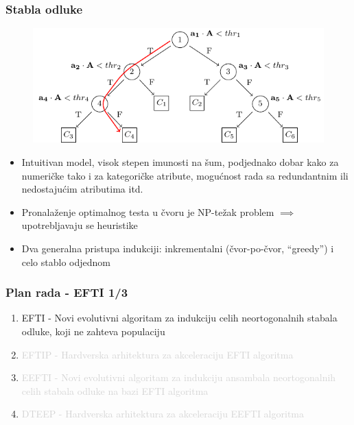 \documentclass{beamer}
\newcommand{\light}[1]{\textcolor{lightgray}{#1}}
\begin{document}
\begin{frame}[fragile]
\frametitle{Stabla odluke}
\begin{figure}
\includegraphics[width=0.7\linewidth]{oblique_dt_traversal.pdf}
\end{figure}
\begin{itemize}
\setlength{\itemsep}{\fill}
\item Intuitivan model, visok stepen imunosti na šum, podjednako dobar kako za numeričke tako i za kategoričke atribute, mogućnost rada sa redundantnim ili nedostajućim atributima itd.
\item Pronalaženje optimalnog testa u čvoru je NP-težak problem $\implies$ upotrebljavaju se heuristike
\item Dva generalna pristupa indukciji: inkrementalni (čvor-po-čvor, ``greedy'') i celo stablo odjednom
\end{itemize}
\end{frame}


\begin{frame}
\frametitle{Plan rada - EFTI 1/3}
\begin{enumerate}
\setlength{\itemsep}{\fill}
\item EFTI - Novi evolutivni algoritam za indukciju celih neortogonalnih stabala
odluke, koji ne zahteva populaciju
\item\light{EFTIP - Hardverska arhitektura za akceleraciju EFTI algoritma}
\item\light{EEFTI - Novi evolutivni algoritam za indukciju ansambala neortogonalnih celih
stabala odluke na bazi EFTI algoritma}
\item\light{DTEEP - Hardverska arhitektura za akceleraciju EEFTI algoritma}
\end{enumerate}
\end{frame}

\end{document}
